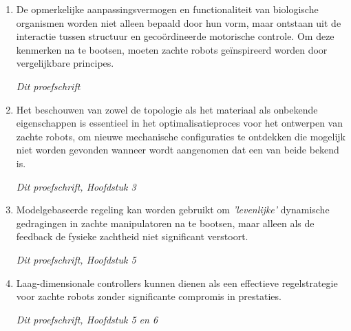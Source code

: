 \documentclass[a5paper]{article}
\begin{document}
\begin{enumerate}
\item De opmerkelijke aanpassingsvermogen en functionaliteit van biologische organismen worden niet alleen bepaald door hun vorm, maar ontstaan uit de interactie tussen structuur en gecoördineerde motorische controle. Om deze kenmerken na te bootsen, moeten zachte robots geïnspireerd worden door vergelijkbare principes.
\begin{flushright}
  \vspace{-5mm}
  \textit{Dit proefschrift}
  \vspace{-1mm}
  \end{flushright}

\item Het beschouwen van zowel de topologie als het materiaal als onbekende eigenschappen is essentieel in het optimalisatieproces voor het ontwerpen van zachte robots, om nieuwe mechanische configuraties te ontdekken die mogelijk niet worden gevonden wanneer wordt aangenomen dat een van beide bekend is.
\begin{flushright}
  \vspace{-3mm}
  \textit{Dit proefschrift, Hoofdstuk 3}
  \vspace{-1mm}
  \end{flushright}


\item Modelgebaseerde regeling kan worden gebruikt om \textit{'levenlijke'} dynamische gedragingen in zachte manipulatoren na te bootsen, maar alleen als de feedback de fysieke zachtheid niet significant verstoort.
\begin{flushright}
\vspace{-3mm}
\textit{Dit proefschrift, Hoofdstuk 5}
\vspace{-1mm}
\end{flushright}

\item Laag-dimensionale controllers kunnen dienen als een effectieve regelstrategie voor zachte robots zonder significante compromis in prestaties.
\begin{flushright}
\vspace{-3mm}
\textit{Dit proefschrift, Hoofdstuk 5 en 6}
\vspace{-1mm}
\end{flushright}  


\end{enumerate}
\end{document}
